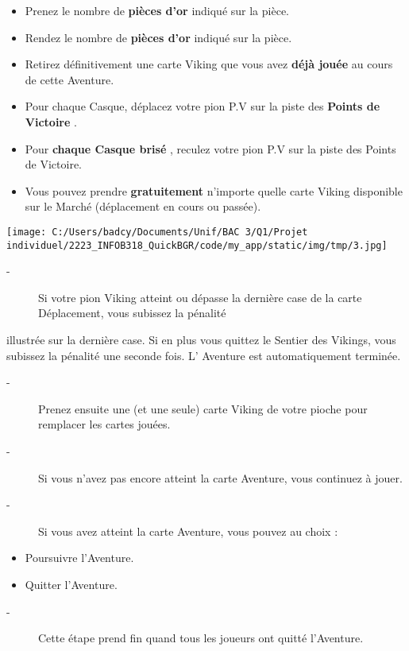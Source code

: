 \documentclass{scrartcl}%
\begin{document}
\begin{itemize}%
\item%
%
 Prenez le nombre de %
\textbf{pièces d'or}%
\textit{ }%
 indiqué sur la pièce.
%
\item%
%
 Rendez le nombre de %
\textbf{pièces d'or}%
\textit{ }%
 indiqué sur la pièce.
%
\item%
%
 Retirez définitivement une carte Viking que vous avez %
\textbf{déjà jouée}%
\textit{ }%
 au cours de cette Aventure.
%
\item%
%
 Pour chaque Casque, déplacez votre pion P.V sur la piste des %
\textbf{Points de Victoire}%
.
%
\item%
%
 Pour %
\textbf{chaque Casque brisé}%
, reculez votre pion P.V sur la piste des Points de Victoire.
%
\item%
%
 Vous pouvez prendre %
\textbf{gratuitement}%
\textit{ }%
 n'importe quelle carte Viking disponible sur le Marché (déplacement en cours ou passée).
%
\end{itemize}%
%
\begin{center}\texttt{[image: C:/Users/badcy/Documents/Unif/BAC 3/Q1/Projet individuel/2223\_INFOB318\_QuickBGR/code/my\_app/static/img/tmp/3.jpg]}\end{center}%

%
\begin{description}%
\item[{-} ]%
%
 Si votre pion Viking atteint ou dépasse la dernière case de la carte Déplacement, vous subissez la pénalité
%
\end{description}%
illustrée sur la dernière case. Si en plus vous quittez le Sentier des Vikings, vous subissez la pénalité une seconde
%
fois. L’ Aventure est automatiquement terminée.
%
\begin{description}%
\item[{-} ]%
%
 Prenez ensuite une (et une seule) carte Viking de votre pioche pour remplacer les cartes jouées.
%
\item[{-} ]%
%
 Si vous n'avez pas encore atteint la carte Aventure, vous continuez à jouer.
%
\item[{-} ]%
%
 Si vous avez atteint la carte Aventure, vous pouvez au choix :
%
\end{description}%
\begin{itemize}%
\item%
%
 Poursuivre l'Aventure.
%
\item%
%
 Quitter l'Aventure.
%
\end{itemize}%
\begin{description}%
\item[{-} ]%
%
 Cette étape prend fin quand tous les joueurs ont quitté l'Aventure.
%
\end{description}
\end{document}
